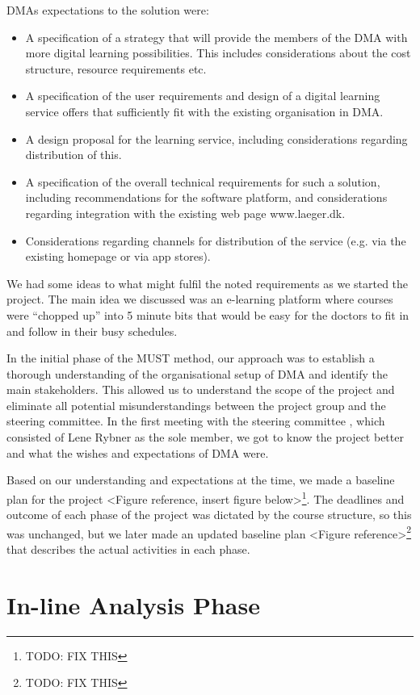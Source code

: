 DMAs expectations to the solution were:

\begin{itemize}
\item A specification of a strategy that will provide the members of the DMA with more digital learning possibilities. This includes considerations about the cost structure, resource requirements etc.
\item A specification of the user requirements and design of a digital learning service offers that sufficiently fit with the existing organisation in DMA.
\item A design proposal for the learning service, including considerations regarding distribution of this.
\item A specification of the overall technical requirements for such a solution, including recommendations for the software platform, and considerations regarding integration with the existing web page www.laeger.dk.
\item Considerations regarding channels for distribution of the service (e.g. via the existing homepage or via app stores).
\end{itemize}

We had some ideas to what might fulfil the noted requirements as we started the project. The main idea we discussed was an e-learning platform where courses were “chopped up” into 5 minute bits that would be easy for the doctors to fit in and follow in their busy schedules.

In the initial phase of the MUST method, our approach was to establish a thorough understanding of the organisational setup of DMA and identify the main stakeholders. This allowed us to understand the scope of the project and eliminate all potential misunderstandings between the project group and the steering committee. In the first meeting with the steering committee , which consisted of Lene Rybner as the sole member, we got to know the project better and what the wishes and expectations of DMA were.

Based on our understanding and expectations at the time, we made a baseline plan for the project <Figure reference, insert figure below>\footnote{TODO: FIX THIS}. The deadlines and outcome of each phase of the project was dictated by the course structure, so this was unchanged, but we later made an updated baseline plan <Figure reference>\footnote{TODO: FIX THIS} that describes the actual activities in each phase.


\section{In-line Analysis Phase}
